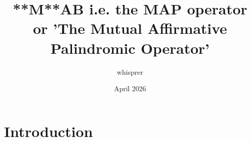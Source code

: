 \documentclass{article}
\title{**M**AB i.e. the MAP operator or 'The Mutual Affirmative Palindromic Operator'}
\author{whisprer}
\date{April 2026}
\begin{document}
\maketitle

\section{Introduction}
\end{document}
